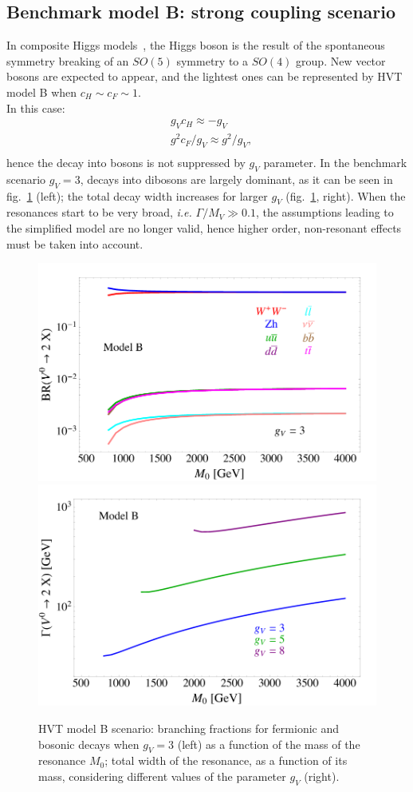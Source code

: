 \subsection{Benchmark model B: strong coupling scenario}
\label{sec:theory_HVT_B}
In composite Higgs models~\cite{Contino2011}, the Higgs boson is the result of the spontaneous symmetry breaking of an $SO(5)$ symmetry to a $SO(4)$ group. New vector bosons are expected to appear, and the lightest ones can be represented by HVT model B when $c_H \sim c_F \sim 1$.\\ 
In this case:
\begin{equation}
\begin{split}
 & g_V c_H \approx -g_V\\
 & g^2 c_F/g_V \approx g^2/g_V,\\
\end{split}
\label{eq:theory_HVT_modelB}
\end{equation}
hence the decay into bosons is not suppressed by $g_V$ parameter. In the benchmark scenario $g_V=3$, decays into dibosons are largely dominant, as it can be seen in fig.~\ref{fig:HVT_modelB_BR_width} (left); the total decay width increases for larger $g_V$ (fig.~\ref{fig:HVT_modelB_BR_width}, right). When the resonances start to be very broad, \textit{i.e.} $\Gamma/M_V \gg 0.1$, the assumptions leading to the simplified model are no longer valid, hence higher order, non-resonant effects must be taken into account.

\begin{figure}[!htb]
  \centering
    \includegraphics[width=.495\textwidth]{figures/Figures_BRSC.png}%
    \includegraphics[width=.495\textwidth]{figures/Figures_WidthSC.png}
  \caption{HVT model B scenario: branching fractions for fermionic and bosonic decays when $g_V = 3$ (left) as a function of the mass of the resonance $M_0$; total width of the resonance, as a function of its mass, considering different values of the parameter $g_V$ (right).}
  \label{fig:HVT_modelB_BR_width}
\end{figure}

